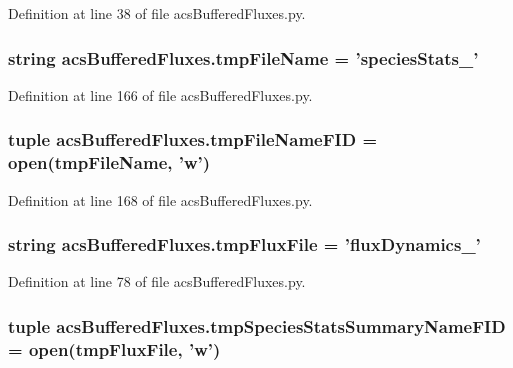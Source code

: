 Definition at line 38 of file acs\-Buffered\-Fluxes.\-py.

\hypertarget{a00098_ae8f3277c929e5b042e62360eaffe3f22}{
\subsubsection[{tmp\-File\-Name}]{\setlength{\rightskip}{0pt plus 5cm}string acs\-Buffered\-Fluxes.\-tmp\-File\-Name = 'species\-Stats\-\_\-'}}\label{a00098_ae8f3277c929e5b042e62360eaffe3f22}


Definition at line 166 of file acs\-Buffered\-Fluxes.\-py.

\hypertarget{a00098_ad593217d9c7c4bdbdc2bbac8cec07790}{
\subsubsection[{tmp\-File\-Name\-F\-I\-D}]{\setlength{\rightskip}{0pt plus 5cm}tuple acs\-Buffered\-Fluxes.\-tmp\-File\-Name\-F\-I\-D = open({\bf tmp\-File\-Name}, 'w')}}\label{a00098_ad593217d9c7c4bdbdc2bbac8cec07790}


Definition at line 168 of file acs\-Buffered\-Fluxes.\-py.

\hypertarget{a00098_a170166907641e54151f8d83d51420165}{
\subsubsection[{tmp\-Flux\-File}]{\setlength{\rightskip}{0pt plus 5cm}string acs\-Buffered\-Fluxes.\-tmp\-Flux\-File = 'flux\-Dynamics\-\_\-'}}\label{a00098_a170166907641e54151f8d83d51420165}


Definition at line 78 of file acs\-Buffered\-Fluxes.\-py.

\hypertarget{a00098_a0b5b14621851cbf162c61aa936ca5f2d}{
\subsubsection[{tmp\-Species\-Stats\-Summary\-Name\-F\-I\-D}]{\setlength{\rightskip}{0pt plus 5cm}tuple acs\-Buffered\-Fluxes.\-tmp\-Species\-Stats\-Summary\-Name\-F\-I\-D = open({\bf tmp\-Flux\-File}, 'w')}}\label{a00098_a0b5b14621851cbf162c61aa936ca5f2d}


